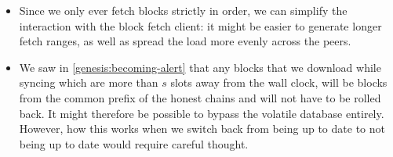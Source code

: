 \begin{itemize}
\item Since we only ever fetch blocks strictly in order, we can simplify
the interaction with the block fetch client: it might be easier to generate
longer fetch ranges, as well as spread the load more evenly across the peers.

\item We saw in \cref{genesis:becoming-alert} that any blocks that we download
while syncing which are more than $s$ slots away from the wall clock, will be
blocks from the common prefix of the honest chains and will not have to be
rolled back. It might therefore be possible to bypass the volatile database
entirely. However, how this works when we switch back from being up to date
to not being up to date would require careful thought.

\end{itemize}
